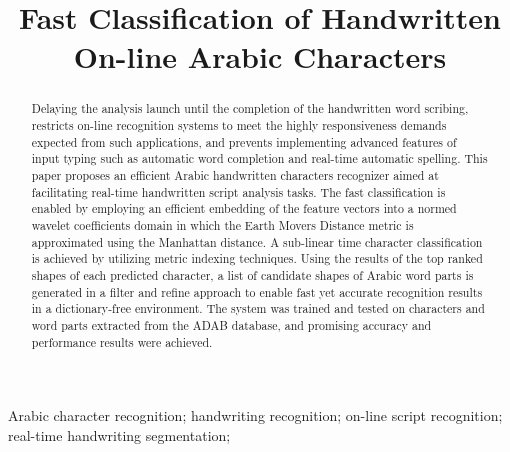 \documentclass[10pt, conference, compsocconf]{IEEEtran}
\begin{document}
\title{Fast Classification of Handwritten On-line Arabic Characters}

\author{
\and
{}
}


\maketitle

\begin{abstract}
Delaying the analysis launch until the completion of the handwritten word scribing, restricts on-line recognition systems to meet the highly responsiveness demands expected from such applications, and prevents implementing advanced features of input typing such as automatic word completion and real-time automatic spelling.
This paper proposes an efficient Arabic handwritten characters recognizer aimed at facilitating real-time handwritten script analysis tasks.
The fast classification is enabled by employing an efficient embedding of the feature vectors into a normed wavelet coefficients domain in which the Earth Movers Distance metric is approximated using the Manhattan distance.
A sub-linear time character classification is achieved by utilizing metric indexing techniques.
Using the results of the top ranked shapes of each predicted character, a list of candidate shapes of Arabic word parts is generated in a filter and refine approach to enable fast yet accurate recognition results in a dictionary-free environment.
The system was trained and tested on characters and word parts extracted from the ADAB database, and promising accuracy and performance results were achieved.\\
\end{abstract}

\begin{IEEEkeywords}
Arabic character recognition; handwriting recognition; on-line script recognition; real-time handwriting segmentation;
\end{IEEEkeywords}
\end{document}
